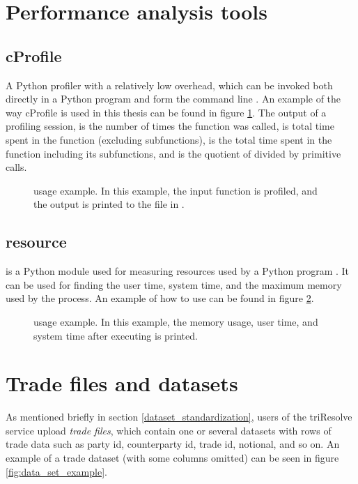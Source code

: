 \section{Performance analysis tools}
\subsection{cProfile}
A Python profiler with a relatively low overhead, which can be invoked both directly in a Python program and form the command line \cite{26_2tppp2d}.
An example of the way cProfile is used in this thesis can be found in figure \ref{fig:profiler_example}. The output of a profiling session,
 is the number of times the function was called,
 is total time spent in the function (excluding subfunctions),  is the total time spent in the function
including its subfunctions, and  is the quotient of  divided by primitive calls.

\begin{figure}[ht]
  \centering
  \caption[ usage example.]{ usage example. In this example, the input function  is profiled, and the output is printed
  to the file in .}
  \label{fig:profiler_example}
\end{figure}

\subsection{resource}
 is a Python module used for measuring resources used by a Python program \cite{36_3rruip2d}. It can be used for finding the user time, system time,
and the maximum memory used by the process. An example of how to use  can be found in figure \ref{fig:resource_example}.

\begin{figure}[ht]
  \centering
  \caption[ usage example.]{ usage example. In this example, the memory usage, user time, and system time after executing  is printed.}
  \label{fig:resource_example}
\end{figure}

\section{Trade files and datasets}
As mentioned briefly in section \ref{dataset_standardization}, users of the triResolve service upload \textit{trade files}, which contain one or several datasets with
rows of trade data such as party id, counterparty id, trade id, notional, and so on. An example of a trade dataset (with some columns omitted) can be seen in figure
\ref{fig:data_set_example}.

